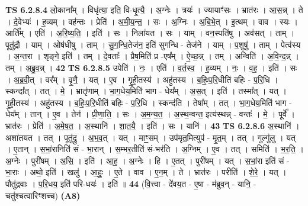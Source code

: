 \documentclass[17pt]{extarticle}
\begin{document}
                  \newline
                                \textbf{ TS 6.2.8.4} \newline
                  लो॒काना᳚म् । विधृ॑त्या॒ इति॒ वि-धृ॒त्यै॒ । अ॒ग्नेः । त्रयः॑ । ज्यायाꣳ॑सः । भ्रात॑रः । आ॒स॒न्न् । ते । दे॒वेभ्यः॑ । ह॒व्यम् । वह॑न्तः । प्रेति॑ । अ॒मी॒य॒न्त॒ । सः । अ॒ग्निः । अ॒बि॒भे॒त् । इ॒त्थम् । वाव । स्यः । आर्ति᳚म् । एति॑ । अ॒रि॒ष्य॒ति॒ । इति॑ । सः । निला॑यत । सः । याम् । वन॒स्पति॑षु । अव॑सत् । ताम् । पूतु॑द्रौ । याम् । ओष॑धीषु । ताम् । सु॒ग॒न्धि॒तेज॑न॒ इति॑ सुगन्धि - तेज॑ने । याम् । प॒शुषु॑ । ताम् । पेत्व॑स्य । अ॒न्त॒रा । शृङ्गे॒ इति॑ । तम् । दे॒वताः᳚ । प्रैष॒मिति॑ प्र -एष᳚म् । ऐ॒च्छ॒न्न् । तम् । अन्विति॑ । अ॒वि॒न्द॒न्न् । तम् । अ॒ब्रु॒व॒न्न् । \textbf{  42} \newline
                  \newline
                                \textbf{ TS 6.2.8.5} \newline
                  उपेति॑ । नः॒ । एति॑ । व॒र्त॒स्व॒ । ह॒व्यम् । नः॒ । व॒ह॒ । इति॑ । सः । अ॒ब्र॒वी॒त् । वर᳚म् । वृ॒णै॒ । यत् । ए॒व । गृ॒ही॒तस्य॑ । अहु॑तस्य । ब॒हिः॒प॒रि॒धीति॑ बहिः - प॒रि॒धि । स्कन्दा᳚त् । तत् । मे॒ । भ्रातृ॑णाम् । भा॒ग॒धेय॒मिति॑ भाग - धेय᳚म् । अ॒स॒त् । इति॑ । तस्मा᳚त् । यत् । गृ॒ही॒तस्य॑ । अहु॑तस्य । ब॒हिः॒प॒रि॒धीति॑ बहिः - प॒रि॒धि । स्कन्द॑ति । तेषा᳚म् । तत् । भा॒ग॒धेय॒मिति॑ भाग - धेय᳚म् । तान् । ए॒व । तेन॑ । प्री॒णा॒ति॒ । सः । अ॒म॒न्य॒त॒ । अ॒स्थ॒न्वन्त॒ इत्य॑स्थन्न् - वन्तः॑ । मे॒ । पूर्वे᳚ । भ्रात॑रः । प्रेति॑ । अ॒मे॒ष॒त॒ । अ॒स्थानि॑ । शा॒त॒यै॒ । इति॑ । सः । यानि॑ । \textbf{  43} \newline
                  \newline
                                \textbf{ TS 6.2.8.6} \newline
                  अ॒स्थानि॑ । अशा॑तयत । तत् । पूतु॑द्रु । अ॒भ॒व॒त् । यत् । माꣳ॒॒सम् । उप॑मृत॒मित्युप॑ - मृ॒त॒म् । तत् । गुल्गु॑लु । यत् । ए॒तान् । स॒भां॒रानिति॑ सं - भा॒रान् । स॒म्भर॒तीति॑ सं-भर॑ति । अ॒ग्निम् । ए॒व । तत् । समिति॑ । भ॒र॒ति॒ । अ॒ग्नेः । पुरी॑षम् । अ॒सि॒ । इति॑ । आ॒ह॒ । अ॒ग्नेः । हि । ए॒तत् । पुरी॑षम् । यत् । स॒भां॒रा इति॑ सं - भा॒राः । अथो॒ इति॑ । खलु॑ । आ॒हुः॒ । ए॒ते । वाव । ए॒न॒म् । ते । भ्रात॑रः । परीति॑ । शे॒रे॒ । यत् । पौतु॑द्रवाः । प॒रि॒धय॒ इति॑ परि-धयः॑ । इति॑ ॥ \textbf{  44 } \newline
                  \newline
                      (वि॒त्त्वा - दे॑वय॒त - ए॒षा - म॑ब्रुव॒न् - यानि॒ - चतु॑श्चत्वारिꣳशच्च)  \textbf{(A8)} \newline \newline
\end{document}
